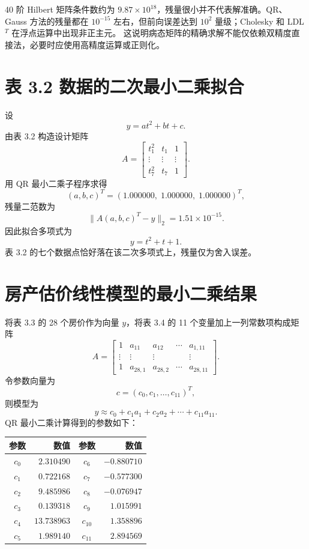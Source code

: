 \documentclass[a4paper,11pt]{article}
\begin{document}
40 阶 Hilbert 矩阵条件数约为 $9.87\times10^{18}$，残量很小并不代表解准确。QR、Gauss 方法的残量都在
$10^{-15}$ 左右，但前向误差达到 $10^2$ 量级；Cholesky 和 LDL$^T$ 在浮点运算中出现非正主元。
这说明病态矩阵的精确求解不能仅依赖双精度直接法，必要时应使用高精度运算或正则化。

\section{表 3.2 数据的二次最小二乘拟合}
设
\[
    y = at^2+bt+c.
\]
由表 3.2 构造设计矩阵
\[
    A=\begin{bmatrix}
    t_1^2&t_1&1\\
    \vdots&\vdots&\vdots\\
    t_7^2&t_7&1
    \end{bmatrix}.
\]
用 QR 最小二乘子程序求得
\[
    (a,b,c)^T=(1.000000,\;1.000000,\;1.000000)^T,
\]
残量二范数为
\[
    \|A(a,b,c)^T-y\|_2=1.51\times10^{-15}.
\]
因此拟合多项式为
\[
    \boxed{y=t^2+t+1}.
\]
表 3.2 的七个数据点恰好落在该二次多项式上，残量仅为舍入误差。

\section{房产估价线性模型的最小二乘结果}
将表 3.3 的 28 个房价作为向量 $y$，将表 3.4 的 11 个变量加上一列常数项构成矩阵
\[
    A=\begin{bmatrix}
    1&a_{11}&a_{12}&\cdots&a_{1,11}\\
    \vdots&\vdots&\vdots&&\vdots\\
    1&a_{28,1}&a_{28,2}&\cdots&a_{28,11}
    \end{bmatrix}.
\]
令参数向量为
\[
    c=(c_0,c_1,\ldots,c_{11})^T,
\]
则模型为
\[
    y\approx c_0+c_1a_1+c_2a_2+\cdots+c_{11}a_{11}.
\]
QR 最小二乘计算得到的参数如下：

\begin{table}[H]
\centering
\begin{tabular}{crcr}
\toprule
参数 & 数值 & 参数 & 数值 \\
\midrule
$c_0$ & $ 2.310490$ & $c_6$  & $-0.880710$ \\
$c_1$ & $ 0.722168$ & $c_7$  & $-0.577300$ \\
$c_2$ & $ 9.485986$ & $c_8$  & $-0.076947$ \\
$c_3$ & $ 0.139318$ & $c_9$  & $ 1.015991$ \\
$c_4$ & $13.738963$ & $c_{10}$ & $ 1.358896$ \\
$c_5$ & $ 1.989140$ & $c_{11}$ & $ 2.894569$ \\
\bottomrule
\end{tabular}
\end{table}
\end{document}
